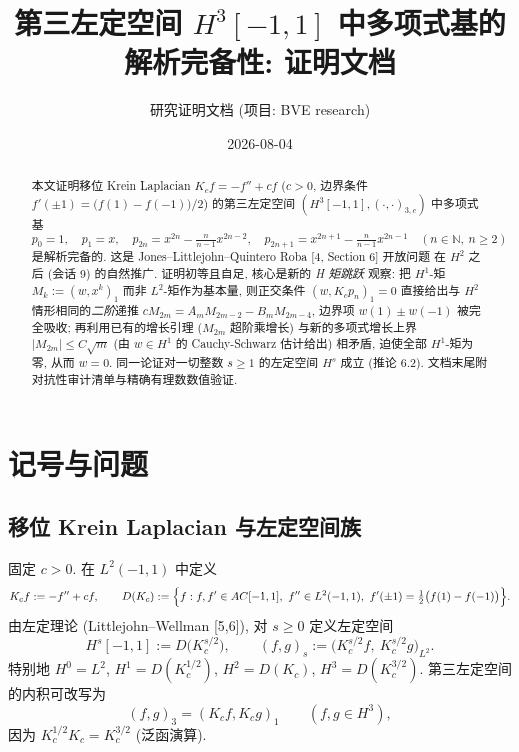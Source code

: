 \documentclass[UTF8]{ctexart}
\title{第三左定空间 \texorpdfstring{$H^3[-1,1]$}{H3} 中多项式基的解析完备性: 证明文档}
\author{研究证明文档 (项目: BVE research)}
\date{2026-08-04}
\begin{document}
\maketitle

\begin{abstract}
本文证明移位 Krein Laplacian $K_c f = -f'' + c f$ ($c > 0$, 边界条件
$f'(\pm1) = \bigl(f(1)-f(-1)\bigr)/2$) 的第三左定空间
$(H^3[-1,1], (\cdot,\cdot)_{3,c})$ 中多项式基
\[
	p_0 = 1, \quad p_1 = x, \quad
	p_{2n} = x^{2n} - \tfrac{n}{n-1} x^{2n-2}, \quad
	p_{2n+1} = x^{2n+1} - \tfrac{n}{n-1} x^{2n-1} \quad (n \in \mathbb{N},\ n \geq 2)
\]
是解析完备的. 这是 Jones--Littlejohn--Quintero Roba [4, Section 6] 开放问题
在 $H^2$ 之后 (会话 9) 的自然推广. 证明初等且自足, 核心是新的 \emph{H 矩跳跃}
观察: 把 $H^1$-矩 $M_k := (w, x^k)_1$ 而非 $L^2$-矩作为基本量, 则正交条件
$(w, K_c p_n)_1 = 0$ 直接给出与 $H^2$ 情形相同的\emph{二阶}递推
$c M_{2m} = A_m M_{2m-2} - B_m M_{2m-4}$, 边界项 $w(1)\pm w(-1)$ 被完全吸收;
再利用已有的增长引理 ($M_{2m}$ 超阶乘增长) 与新的多项式增长上界
$|M_{2m}| \leq C\sqrt{m}$ (由 $w \in H^1$ 的 Cauchy-Schwarz 估计给出) 相矛盾,
迫使全部 $H^1$-矩为零, 从而 $w = 0$. 同一论证对一切整数 $s \geq 1$ 的左定空间
$H^s$ 成立 (推论 6.2). 文档末尾附对抗性审计清单与精确有理数数值验证.
\end{abstract}

\tableofcontents

\section{记号与问题}

\subsection{移位 Krein Laplacian 与左定空间族}

固定 $c > 0$. 在 $L^2(-1,1)$ 中定义
\begin{equation}
	K_c f := -f'' + c f, \qquad
	D(K_c) := \Bigl\{ f : f, f' \in AC[-1,1],\ f'' \in L^2(-1,1),\
		f'(\pm 1) = \tfrac{1}{2}\bigl( f(1) - f(-1) \bigr) \Bigr\}.
\end{equation}
由左定理论 (Littlejohn--Wellman [5,6]), 对 $s \geq 0$ 定义左定空间
\begin{equation}
	H^s[-1,1] := D\bigl(K_c^{s/2}\bigr), \qquad
	(f, g)_s := \bigl( K_c^{s/2} f,\ K_c^{s/2} g \bigr)_{L^2}.
\end{equation}
特别地 $H^0 = L^2$, $H^1 = D(K_c^{1/2})$, $H^2 = D(K_c)$, $H^3 = D(K_c^{3/2})$.
第三左定空间的内积可改写为
\begin{equation}
	(f, g)_3 = (K_c f, K_c g)_1 \qquad (f, g \in H^3),
\end{equation}
因为 $K_c^{1/2} K_c = K_c^{3/2}$ (泛函演算).
\end{document}
